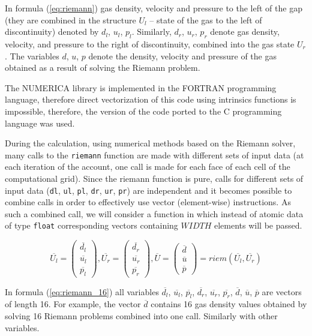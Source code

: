 \documentclass[
11pt,%
tightenlines,%
twoside,%
onecolumn,%
nofloats,%
nobibnotes,%
nofootinbib,%
superscriptaddress,%
noshowpacs,%
centertags]%
{revtex4}
\begin{document}
In formula (\ref{eq:riemann}) gas density, velocity and pressure to the left of the gap (they are combined in the structure $U_l$ -- state of the gas to the left of discontinuity) denoted by $d_l$, $u_l$, $p_l$.
Similarly, $d_r$, $u_r$, $p_r$ denote gas density, velocity, and pressure to the right of discontinuity, combined into the gas state $U_r$.
The variables $d$, $u$, $p$ denote the density, velocity and pressure of the gas obtained as a result of solving the Riemann problem.

The NUMERICA library is implemented in the FORTRAN programming language, therefore direct vectorization of this code using intrinsics functions is impossible, therefore, the version of the code ported to the C programming language was used.

During the calculation, using numerical methods based on the Riemann solver, many calls to the \texttt{riemann} function are made with different sets of input data (at each iteration of the account, one call is made for each face of each cell of the computational grid).
Since the riemann function is pure, calls for different sets of input data (\texttt{dl}, \texttt{ul}, \texttt{pl}, \texttt{dr}, \texttt{ur}, \texttt{pr}) are independent and it becomes possible to combine calls in order to effectively use vector (element-wise) instructions.
As such a combined call, we will consider a function in which instead of atomic data of type \texttt{float} corresponding vectors containing $WIDTH$ elements will be passed.

\begin{equation}\label{eq:riemann_16}
\overline{U_l} = \left( \begin{array}{ccc} \overline{d_l} \\ \overline{u_l} \\ \overline{p_l} \end{array} \right),
\overline{U_r} = \left( \begin{array}{ccc} \overline{d_r} \\ \overline{u_r} \\ \overline{p_r} \end{array} \right),
\overline{U} = \left( \begin{array}{ccc} \overline{d} \\ \overline{u} \\ \overline{p} \end{array} \right) = riem(\overline{U_l}, \overline{U_r})
\end{equation}

In formula (\ref{eq:riemann_16}) all variables $\overline{d_l}$, $\overline{u_l}$, $\overline{p_l}$, $\overline{d_r}$, $\overline{u_r}$, $\overline{p_r}$, $\overline{d}$, $\overline{u}$, $\overline{p}$ are vectors of length 16.
For example, the vector $\overline{d}$ contains 16 gas density values obtained by solving 16 Riemann problems combined into one call.
Similarly with other variables.
\end{document}
